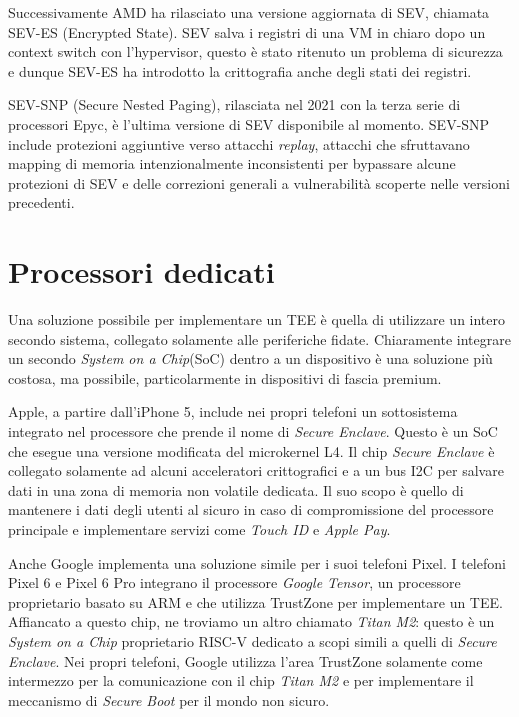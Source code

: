 \documentclass[12pt,italian]{report}
\begin{document}
\medbreak

Successivamente AMD ha rilasciato una versione aggiornata di SEV, chiamata
SEV-ES (Encrypted State)\cite{sev_es}. SEV salva i registri
di una VM in chiaro dopo un context switch con l'hypervisor, questo è
stato ritenuto un problema di sicurezza e dunque SEV-ES ha introdotto la
crittografia anche degli stati dei registri.

SEV-SNP (Secure Nested Paging)\cite{sev_snp}, rilasciata nel 2021
con la terza serie di processori Epyc, è l'ultima versione di SEV
disponibile al momento.
SEV-SNP include protezioni aggiuntive verso
attacchi \textit{replay}, attacchi che sfruttavano mapping di memoria
intenzionalmente inconsistenti per bypassare alcune protezioni di SEV
e delle correzioni generali a vulnerabilità scoperte nelle versioni 
precedenti.

\section{Processori dedicati}
\label{sec:processori-dedicati}
Una soluzione possibile per implementare un TEE è quella di utilizzare
un intero secondo sistema, collegato solamente alle periferiche fidate.
Chiaramente integrare un secondo \textit{System on a Chip}(SoC) dentro
a un dispositivo è una soluzione più costosa, ma possibile, particolarmente
in dispositivi di fascia premium.

\bigbreak \noindent

Apple, a partire dall'iPhone 5, include nei propri telefoni un sottosistema
integrato nel processore che prende il nome di
\textit{Secure Enclave}.
Questo è un SoC che esegue una versione modificata del
microkernel L4\cite{secure_enclave}.
Il chip \textit{Secure Enclave} è collegato solamente ad alcuni
acceleratori crittografici e a un bus I2C per salvare dati in una zona di
memoria non volatile dedicata.
Il suo scopo è quello di mantenere i dati
degli utenti al sicuro in caso di compromissione del processore principale
e implementare servizi come \textit{Touch ID} e \textit{Apple Pay}.

\bigbreak \noindent
Anche Google implementa una soluzione simile per i suoi telefoni Pixel.
I telefoni Pixel 6 e Pixel 6 Pro integrano il processore
\textit{Google Tensor}, un processore proprietario basato su ARM e che
utilizza TrustZone per implementare un TEE.
Affiancato a questo chip, ne troviamo un altro chiamato \textit{Titan M2}:
questo è un \textit{System on a Chip} proprietario RISC-V dedicato a
scopi simili a quelli di \textit{Secure Enclave}.   
Nei propri telefoni, Google utilizza l'area TrustZone solamente come
intermezzo per la comunicazione con il chip \textit{Titan M2} e per
implementare il meccanismo di \textit{Secure Boot} per il mondo
non sicuro.
\end{document}
